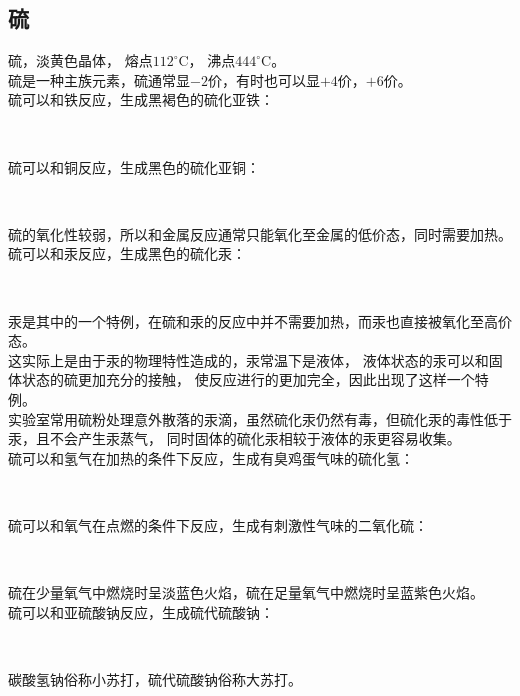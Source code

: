 \documentclass[UTF8]{ctexart}
\begin{document}
\subsection{硫}
    硫，淡黄色晶体，
    熔点$112^\circ$C，
    沸点$444^\circ$C。\\[3mm]
    硫是一种主族元素，硫通常显$-2$价，有时也可以显$+4$价，$+6$价。\\[5mm]
    硫可以和铁反应，生成黑褐色的硫化亚铁：
    \begin{center}
        \\[3mm]
    \end{center}
    硫可以和铜反应，生成黑色的硫化亚铜：
    \begin{center}
        \\[5mm]
    \end{center}
    硫的氧化性较弱，所以和金属反应通常只能氧化至金属的低价态，同时需要加热。\\[6mm]
    硫可以和汞反应，生成黑色的硫化汞：
    \begin{center}
        \\[3mm]
    \end{center}
    汞是其中的一个特例，在硫和汞的反应中并不需要加热，而汞也直接被氧化至高价态。\\[3mm]
    这实际上是由于汞的物理特性造成的，汞常温下是液体，
    液体状态的汞可以和固体状态的硫更加充分的接触，
    使反应进行的更加完全，因此出现了这样一个特例。\\[3mm]
    实验室常用硫粉处理意外散落的汞滴，虽然硫化汞仍然有毒，但硫化汞的毒性低于汞，且不会产生汞蒸气，
    同时固体的硫化汞相较于液体的汞更容易收集。\\[5mm]
    硫可以和氢气在加热的条件下反应，生成有臭鸡蛋气味的硫化氢：
    \begin{center}
        \\[3mm]
    \end{center}
    硫可以和氧气在点燃的条件下反应，生成有刺激性气味的二氧化硫：
    \begin{center}
        \\[3mm]
    \end{center}
    硫在少量氧气中燃烧时呈淡蓝色火焰，硫在足量氧气中燃烧时呈蓝紫色火焰。\\[5mm]
    硫可以和亚硫酸钠反应，生成硫代硫酸钠：
    \begin{center}
        \\[3mm]
    \end{center}
    碳酸氢钠俗称小苏打，硫代硫酸钠俗称大苏打。
\end{document}
